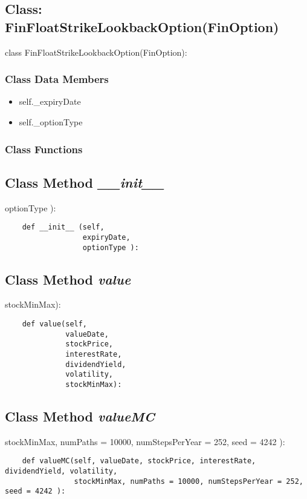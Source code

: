\documentclass[twoside,11pt]{book}
\begin{document}
\subsection{Class: FinFloatStrikeLookbackOption(FinOption)}
class FinFloatStrikeLookbackOption(FinOption):

\subsubsection{Class Data Members}
\begin{itemize}
\item{self.\_expiryDate}
\item{self.\_optionType}
\end{itemize}

\subsubsection{Class Functions}

\subsection{Class Method {\it \_\_init\_\_ }}
optionType ):

\begin{lstlisting}
    def __init__ (self,
                  expiryDate,
                  optionType ):
\end{lstlisting}

\subsection{Class Method {\it value}}
stockMinMax):

\begin{lstlisting}
    def value(self,
              valueDate,
              stockPrice,
              interestRate,
              dividendYield,
              volatility, 
              stockMinMax):
\end{lstlisting}

\subsection{Class Method {\it valueMC}}
stockMinMax, numPaths = 10000, numStepsPerYear = 252, seed = 4242 ):

\begin{lstlisting}
    def valueMC(self, valueDate, stockPrice, interestRate, dividendYield, volatility, 
                stockMinMax, numPaths = 10000, numStepsPerYear = 252, seed = 4242 ):
\end{lstlisting}
\end{document}
